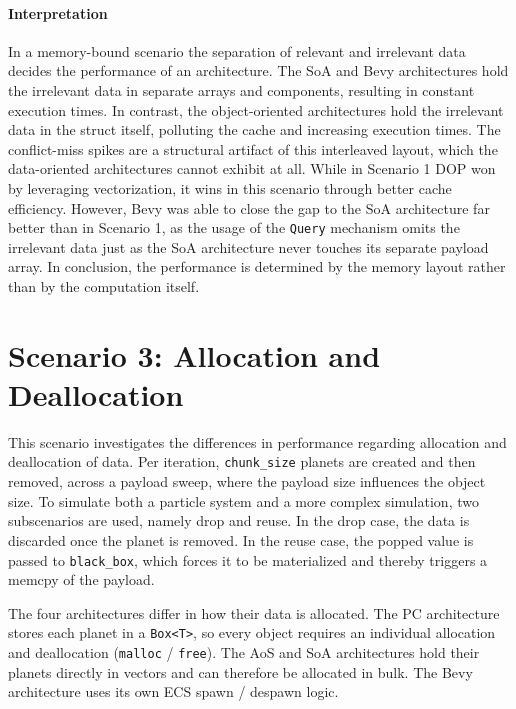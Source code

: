 \paragraph{Interpretation}
In a memory-bound scenario the separation of relevant and irrelevant data decides the performance of an architecture. The \ac{SoA} and Bevy architectures hold the irrelevant data in separate arrays and components, resulting in constant execution times. In contrast, the object-oriented architectures hold the irrelevant data in the struct itself, polluting the cache and increasing execution times. The conflict-miss spikes are a structural artifact of this interleaved layout, which the data-oriented architectures cannot exhibit at all. While in Scenario 1 \ac{DOP} won by leveraging vectorization, it wins in this scenario through better cache efficiency. However, Bevy was able to close the gap to the \ac{SoA} architecture far better than in Scenario 1, as the usage of the \texttt{Query} mechanism omits the irrelevant data just as the \ac{SoA} architecture never touches its separate payload array. In conclusion, the performance is determined by the memory layout rather than by the computation itself.

\section{Scenario 3: Allocation and Deallocation}
\label{sec:evaluation:scenario3}
This scenario investigates the differences in performance regarding allocation and deallocation of data. Per iteration, \texttt{chunk\_size} planets are created and then removed, across a payload sweep, where the payload size influences the object size. To simulate both a particle system and a more complex simulation, two subscenarios are used, namely drop and reuse. In the drop case, the data is discarded once the planet is removed. In the reuse case, the popped value is passed to \texttt{black\_box}, which forces it to be materialized and thereby triggers a memcpy of the payload. 

The four architectures differ in how their data is allocated. The PC architecture stores each planet in a \texttt{Box<T>}, so every object requires an individual allocation and deallocation (\texttt{malloc} / \texttt{free}). The AoS and SoA architectures hold their planets directly in vectors and can therefore be allocated in bulk. The Bevy architecture uses its own ECS spawn / despawn logic.

